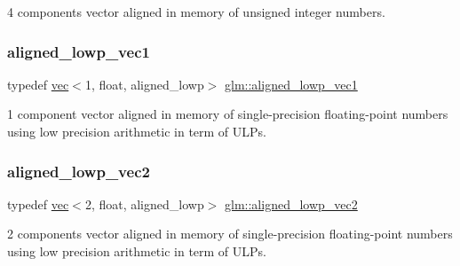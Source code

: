 4 components vector aligned in memory of unsigned integer numbers. 

\mbox{\label{group__gtc__type__aligned_ga9a7ee43ec4c9d0c59740b96c10aee479}} 
\subsubsection{\texorpdfstring{aligned\+\_\+lowp\+\_\+vec1}{aligned\_lowp\_vec1}}
{\footnotesize\ttfamily typedef \hyperlink{structglm_1_1vec}{vec}$<$1, float, aligned\+\_\+lowp$>$ \hyperlink{group__gtc__type__aligned_ga9a7ee43ec4c9d0c59740b96c10aee479}{glm\+::aligned\+\_\+lowp\+\_\+vec1}}



1 component vector aligned in memory of single-\/precision floating-\/point numbers using low precision arithmetic in term of U\+L\+Ps. 

\mbox{\label{group__gtc__type__aligned_ga10048e69ffac79ec5ea059398485114e}} 
\subsubsection{\texorpdfstring{aligned\+\_\+lowp\+\_\+vec2}{aligned\_lowp\_vec2}}
{\footnotesize\ttfamily typedef \hyperlink{structglm_1_1vec}{vec}$<$2, float, aligned\+\_\+lowp$>$ \hyperlink{group__gtc__type__aligned_ga10048e69ffac79ec5ea059398485114e}{glm\+::aligned\+\_\+lowp\+\_\+vec2}}



2 components vector aligned in memory of single-\/precision floating-\/point numbers using low precision arithmetic in term of U\+L\+Ps. 

\mbox{\label{group__gtc__type__aligned_ga74eb3cf8a9ff6234da5d26f9203e179d}} 
